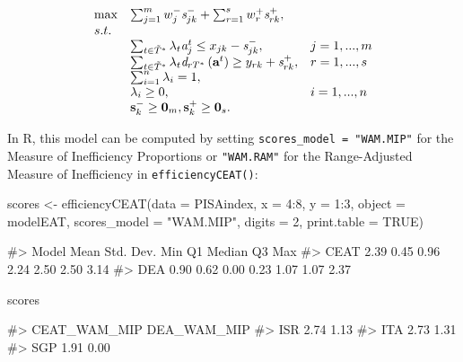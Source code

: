 \begin{equation} \label{(34)} 
\begin{array}{lllll} 
{} & {\max } & {\sum_{j=1}^{m}w_{j}^{-} {\it s}_{jk}^{-} +\sum_{r=1}^{s}w_{r}^{+} {\it s}_{rk}^{+},} & {} & {} \\ 
{} & {s.t.} & {} & {} & {} \\ 
{} & {} & {\sum_{t\in \tilde{T}^{*}}^{}\lambda_{t} {\it a}_{j}^{t}  \le x_{jk} - {\it s}_{jk}^{-} ,} & {j=1,...,m} & {} \\
{} & {} & {\sum_{t\in \tilde{T}^{*}}^{}\lambda_{t} {\it d}_{rT^{*}} \left({\it \textbf{a}}^{t} \right) \ge y_{rk} +{\it s}_{rk}^{+} ,} & {r=1,...,s} & {} \\ 
{} & {} & {\sum_{i=1}^{n}\lambda_{i} = 1,} & {} & {} \\ 
{} & {} & {\lambda _{i} \ge 0,} & {i=1,...,n} & {} \\ 
{} & {} & {{\it \textbf{s}}_{k}^{-} \ge \textbf{0}_{m}, {\it \textbf{s}}_{k}^{+} \ge \textbf{0}_{s}.} 
\end{array}
\end{equation}

In R, this model can be computed by setting
\texttt{scores\_model\ =\ "WAM.MIP"} for the Measure of Inefficiency
Proportions or \texttt{"WAM.RAM"} for the Range-Adjusted Measure of
Inefficiency in \texttt{efficiencyCEAT()}:

\begin{Schunk}
\begin{Sinput}
scores <- efficiencyCEAT(data = PISAindex, x = 4:8, y = 1:3, object = modelEAT,
                         scores_model = "WAM.MIP", digits = 2,
                         print.table = TRUE)
\end{Sinput}
\begin{Soutput}
#>  Model Mean Std. Dev.  Min   Q1 Median   Q3  Max
#>   CEAT 2.39      0.45 0.96 2.24   2.50 2.50 3.14
#>    DEA 0.90      0.62 0.00 0.23   1.07 1.07 2.37
\end{Soutput}
\begin{Sinput}
scores %>% sample_n(3)
\end{Sinput}
\begin{Soutput}
#>     CEAT_WAM_MIP DEA_WAM_MIP
#> ISR         2.74        1.13
#> ITA         2.73        1.31
#> SGP         1.91        0.00
\end{Soutput}
\end{Schunk}

